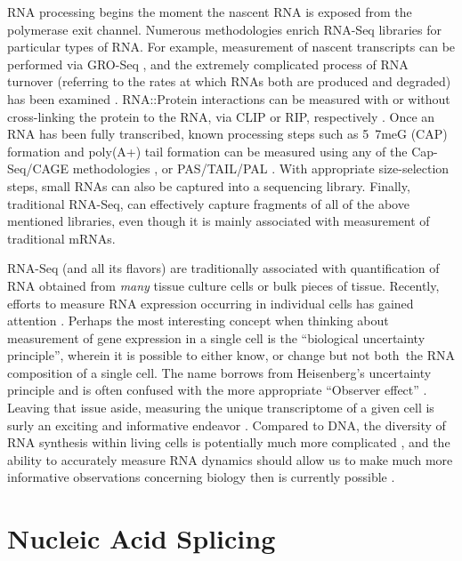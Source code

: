     RNA processing begins the moment the nascent RNA is exposed from the polymerase exit channel. Numerous methodologies enrich RNA-Seq libraries for particular types of RNA. For example, measurement of nascent transcripts can be performed via GRO-Seq \citep{Core2008a}, and the extremely complicated process of RNA turnover (referring to the rates at which RNAs both are produced and degraded) has been examined \citep{Ghosh2010a, Tani2012}. RNA::Protein interactions can be measured with or without cross-linking the protein to the RNA, via CLIP or RIP, respectively \citep{Ule2005,Licatalosi2006,Singh2013}. Once an RNA has been fully transcribed, known processing steps such as 5\textprime~7meG (CAP) formation and poly(A+) tail formation can be measured using any of the Cap-Seq/CAGE methodologies \citep{Shiraki2003a}, or PAS/TAIL/PAL \citep{Shepard2011, Chang2014b, Subtelny2014}. With appropriate size-selection steps, small RNAs \citep{Ghildiyal2008} can also be captured into a sequencing library. Finally, traditional RNA-Seq, can effectively capture fragments of all of the above mentioned libraries, even though it is mainly associated with measurement of traditional mRNAs.

    RNA-Seq (and all its flavors) are traditionally associated with quantification of RNA obtained from \textit{many} tissue culture cells or bulk pieces of tissue. Recently, efforts to measure RNA expression occurring in individual cells has gained attention \citep{Shapiro2013b}. Perhaps the most interesting concept when thinking about measurement of gene expression in a single cell is the ``biological uncertainty principle'', wherein it is possible to either know, or change \textemdash but not both\textemdash~the RNA composition of a single cell. The name borrows from Heisenberg's uncertainty principle \citep{Kennard1927} and is often confused with the more appropriate ``Observer effect'' \citep{Riley2013}. Leaving that issue aside, measuring the unique transcriptome of a given cell is surly an exciting and informative endeavor \citep{Marinov2013, Shalek2013b,Wills2013}. Compared to DNA, the diversity of RNA synthesis within living cells is potentially much more complicated \citep{Shendure2012}, and the ability to accurately measure RNA dynamics should allow us to make much more informative observations concerning biology then is currently possible \citep{Djebali2012}.

\section{Nucleic Acid Splicing}
  \label{Intro:sec:Nucleic Acid Splicing}

